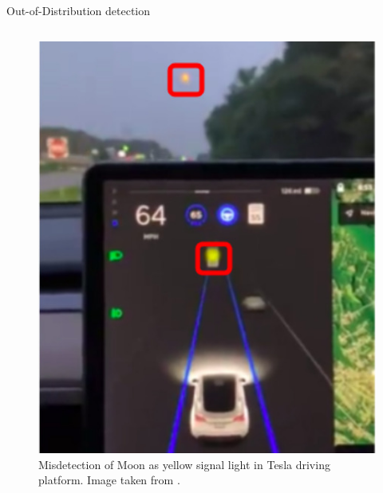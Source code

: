 \documentclass[aspectratio=169]{beamer}
\begin{document}
\begin{frame}{Out-of-Distribution detection}
\begin{columns}
\begin{column}{0.5\textwidth}
        \begin{figure}
            \centering
            \includegraphics[scale=0.25]{images/Tesla_ex_moon.jpg}
            \caption{Misdetection of Moon as yellow signal light in Tesla driving platform. Image taken from \cite{tesla_fails}.}
            \label{fig:eg_tesla_moon}
        \end{figure}
        \end{column}
    \end{columns}
\end{frame}
\end{document}
